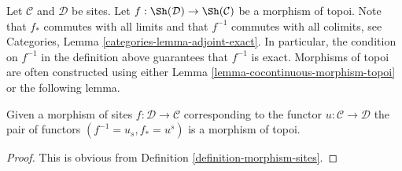 \medskip\noindent
Let $\mathcal{C}$ and $\mathcal{D}$ be sites. Let
$f : \Sh(\mathcal{D}) \to \Sh(\mathcal{C})$ be a morphism of topoi.
Note that $f_*$ commutes with all limits and that
$f^{-1}$ commutes with all colimits, see Categories,
Lemma \ref{categories-lemma-adjoint-exact}.
In particular, the condition on $f^{-1}$ in the definition above
guarantees that $f^{-1}$ is exact. Morphisms of topoi are often constructed
using either Lemma \ref{lemma-cocontinuous-morphism-topoi}
or the following lemma.

\begin{lemma}
\label{lemma-morphism-sites-topoi}
Given a morphism of sites $f : \mathcal{D} \to \mathcal{C}$
corresponding to the functor $u : \mathcal{C} \to \mathcal{D}$
the pair of functors $(f^{-1} = u_s, f_* = u^s)$ is a morphism of topoi.
\end{lemma}

\begin{proof}
This is obvious from Definition \ref{definition-morphism-sites}.
\end{proof}

